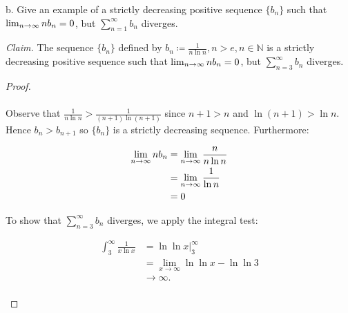 b.  Give an example of a strictly decreasing positive sequence $\{b_n\}$ such
    that ${\lim_{n \rightarrow \infty}{nb_n}} = 0$, but
    $\sum\limits_{n=1}^{\infty}{b_n}$ diverges.
          
    \emph{Claim.} The sequence $\{b_n\}$ defined by 
    $b_n \coloneqq \frac{1}{n\ln{n}}, n > e, n \in \mathbb{N}$ is a strictly
    decreasing positive sequence such that 
    ${\lim_{n \rightarrow \infty}{nb_n}} = 0$, but
    $\sum\limits_{n=3}^{\infty}{b_n}$ diverges.

    \begin{proof}\ \\\\
        Observe that $\frac{1}{n\ln{n}} > \frac{1}{(n+1)\ln{(n+1)}}$ since 
        $n + 1 > n$ and $\ln{(n+1)} > \ln{n}$. Hence $b_{n} > b_{n+1}$ so
        $\{b_n\}$ is a strictly decreasing sequence. Furthermore:

        \begin{align*}
            {\lim_{n \rightarrow \infty}{nb_n}} &= {\lim_{n \rightarrow \infty}{\frac{n}{n\ln{n}}}} \\
                                              &= {\lim_{n \rightarrow \infty}{\frac{1}{\ln{n}}}} \\
                                              &= 0
        \end{align*}

        To show that $\sum\limits_{n=3}^{\infty}{b_n}$ diverges, we apply the
        integral test:

        \begin{align*}
            \int_3^\infty{\frac{1}{x\ln{x}}} &= \ln{\ln{x}}\rvert_3^\infty  \\
                                             &= \lim_{x \rightarrow \infty}{\ln{\ln{x}}} - \ln{\ln{3}} \\
                                             &\rightarrow \infty.
        \end{align*}
        \\
    \end{proof}